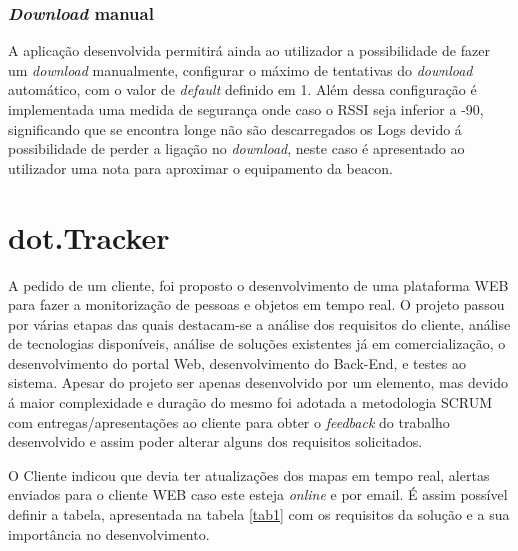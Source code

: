 \subsubsection{\textit{Download} manual}
\par A aplicação desenvolvida permitirá ainda ao utilizador a possibilidade de fazer um \textit{download} manualmente, configurar o máximo de tentativas do \textit{download} automático, com o valor de \textit{default} definido em 1. Além dessa configuração é implementada uma medida de segurança onde caso o RSSI seja inferior a -90, significando que se encontra longe não são descarregados os Logs devido á possibilidade de perder a ligação no \textit{download}, neste caso é apresentado ao utilizador uma nota para aproximar o equipamento da beacon. %

\section {dot.Tracker}
\par
A pedido de um cliente, foi proposto o desenvolvimento de uma plataforma WEB para fazer a monitorização de pessoas e objetos em tempo real. O projeto passou por várias etapas das quais destacam-se a análise dos requisitos do cliente, análise de tecnologias disponíveis, análise de soluções existentes já em comercialização, o desenvolvimento do portal Web, desenvolvimento do Back-End, e testes ao sistema. Apesar do projeto ser apenas desenvolvido por um elemento, mas devido á maior complexidade e duração do mesmo foi adotada a metodologia SCRUM com entregas/apresentações ao cliente para obter o \textit{feedback} do trabalho desenvolvido e assim poder alterar alguns dos requisitos solicitados.
\par O Cliente indicou que devia ter atualizações dos mapas em tempo real, alertas enviados para o cliente WEB caso este esteja \textit{online} e por email.
É assim possível definir a tabela, apresentada na tabela \ref{tab1} com os requisitos da solução e a sua importância no desenvolvimento.

